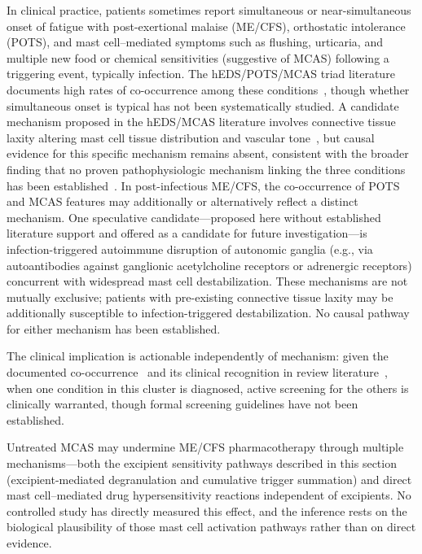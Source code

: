 \begin{observation}
\label{obs:triad-simultaneous-onset}
In clinical practice, patients sometimes report simultaneous or near-simultaneous onset of fatigue with post-exertional malaise (ME/CFS), orthostatic intolerance (POTS), and mast cell--mediated symptoms such as flushing, urticaria, and multiple new food or chemical sensitivities (suggestive of MCAS) following a triggering event, typically infection. The hEDS/POTS/MCAS triad literature documents high rates of co-occurrence among these conditions~\cite{Wang2021triad}, though whether simultaneous onset is typical has not been systematically studied. A candidate mechanism proposed in the hEDS/MCAS literature involves connective tissue laxity altering mast cell tissue distribution and vascular tone~\cite{Seneviratne2017}, but causal evidence for this specific mechanism remains absent, consistent with the broader finding that no proven pathophysiologic mechanism linking the three conditions has been established~\cite{Kucharik2020}. In post-infectious ME/CFS, the co-occurrence of POTS and MCAS features may additionally or alternatively reflect a distinct mechanism. One speculative candidate---proposed here without established literature support and offered as a candidate for future investigation---is infection-triggered autoimmune disruption of autonomic ganglia (e.g., via autoantibodies against ganglionic acetylcholine receptors or adrenergic receptors) concurrent with widespread mast cell destabilization. These mechanisms are not mutually exclusive; patients with pre-existing connective tissue laxity may be additionally susceptible to infection-triggered destabilization. No causal pathway for either mechanism has been established.

The clinical implication is actionable independently of mechanism: given the documented co-occurrence~\cite{Wang2021triad} and its clinical recognition in review literature~\cite{Kucharik2020}, when one condition in this cluster is diagnosed, active screening for the others is clinically warranted, though formal screening guidelines have not been established.

Untreated MCAS may undermine ME/CFS pharmacotherapy through multiple mechanisms---both the excipient sensitivity pathways described in this section (excipient-mediated degranulation and cumulative trigger summation) and direct mast cell--mediated drug hypersensitivity reactions independent of excipients. No controlled study has directly measured this effect, and the inference rests on the biological plausibility of those mast cell activation pathways rather than on direct evidence.


\end{observation}
